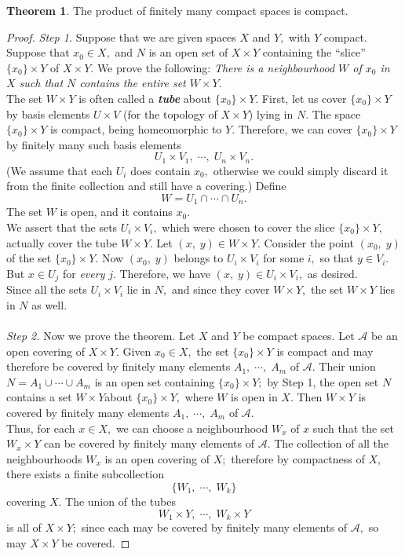 \documentclass{article}
\theoremstyle{definition}
\newtheorem{theorem}{Theorem}[section]
\begin{document}
%
\begin{theorem}\label{thm:compact product}
  The product of finitely many compact spaces is compact.
\end{theorem}
\begin{proof}
  \emph{Step 1.} Suppose that we are given spaces $X$ and $Y,$ with $Y$ compact. Suppose that $x_0 \in X,$ and $N$ is an open set of $X\times Y$ containing the ``slice'' $\{x_0\}\times Y$ of $X \times Y.$ We prove the following:
  \emph{There is a neighbourhood $W$ of $x_0$ in $X$ such that $N$ contains the entire set $W\times Y.$}\\
  The set $W \times Y$ is often called a \textbf{\emph{tube}} about $\{x_0\} \times Y.$
  First, let us cover $\{x_0\}\times Y$ by basis elements $U \times V$ (for the topology of $X \times Y$) lying in $N.$ The space $\{x_0\}\times Y$ is compact, being homeomorphic to $Y.$ Therefore, we can cover $\{x_0\}\times Y$ by finitely many such basis elements
  \[U_1 \times V_1,\;\cdots,\;U_n\times V_n.\]
  (We assume that each $U_i$ does contain $x_0,$ otherwise we could simply discard it from the finite collection and still have a covering.) Define
  \[W = U_1 \cap \cdots \cap U_n.\]
  The set $W$ is open, and it contains $x_0.$\\
  We assert that the sets $U_i \times V_i,$ which were chosen to cover the slice $\{x_0\} \times Y,$ actually cover the tube $W\times Y.$ Let $(x,\;y) \in W\times Y.$ Consider the point $(x_0,\;y)$ of the set $\{x_0\}\times Y.$ Now $(x_0,\;y)$ belongs to $U_i \times V_i$ for some $i,$ so that $y \in V_i.$ But $x \in U_j$ for \emph{every} $j.$ Therefore, we have $(x,\; y) \in U_i \times V_i,$ as desired.\\
  Since all the sets $U_i \times V_i$ lie in $N,$ and since they cover $W\times Y,$ the set $W \times Y$ lies in $N$ as well.\\\\
  \emph{Step 2.} Now we prove the theorem. Let $X$ and $Y$ be compact spaces. Let $\mathcal{A}$ be an open covering of $X \times Y.$ Given $x_0 \in X,$ the set $\{x_0\}\times Y$ is compact and may therefore be covered by finitely many elements $A_1,\;\cdots,\;A_m$ of $\mathcal{A}.$ Their union $N = A_1 \cup\cdots\cup A_m$ is an open set containing $\{x_0\}\times Y;$ by Step 1, the open set $N$ contains a set $W \times Y$about $\{x_0\}\times Y,$ where $W$ is open in $X.$ Then $W \times Y$ is covered by finitely many elements $A_1,\;\cdots,\;A_m$ of $\mathcal{A}.$\\
  Thus, for each $x \in X,$ we can choose a neighbourhood $W_x$ of $x$ such that the set $W_x \times Y$ can be covered by finitely many elements of $\mathcal{A}.$ The collection of all the neighbourhoods $W_x$ is an open covering of $X;$ therefore by compactness of $X,$ there exists a finite subcollection
  \[\{W_1,\;\cdots,\;W_k\}\]
  covering $X.$ The union of the tubes
  \[W_1 \times Y,\;\cdots,\; W_k \times Y\]
  is all of $X\times Y;$ since each may be covered by finitely many elements of $\mathcal{A},$ so may $X \times Y$ be covered.
\end{proof}
\end{document}

